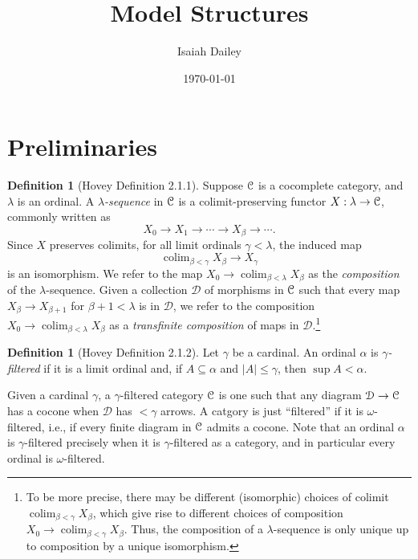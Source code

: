\documentclass{amsart}
\title{Model Structures}
\author{Isaiah Dailey}
\date{\today}
\theoremstyle{plain}
\theoremstyle{definition}
\newtheorem{definition}[theorem]{Definition}
\newcommand{\sseq}{\subseteq}
\newcommand{\0}{\mathbf{0}}
\newcommand{\cC}{\mathcal C}
\newcommand{\cD}{\mathcal D}
\renewcommand{\(}{\left(}
\renewcommand{\)}{\right)}
\def\scr{\EuScript}
\def\cC{\scr{C}}
\DeclareMathOperator*{\colim}{colim}
\begin{document}
\maketitle


\tableofcontents

\section{Preliminaries}

\begin{definition}[Hovey Definition 2.1.1]
  Suppose $\cC$ is a cocomplete category, and $\lambda$ is an ordinal. A \textit{$\lambda$-sequence} in $\cC$ is a colimit-preserving functor $X:\lambda\to\cC$, commonly written as
  \[X_0\to X_1\to\cdots\to X_\beta\to\cdots.\]
  Since $X$ preserves colimits, for all limit ordinals $\gamma<\lambda$, the induced map
  \[\colim_{\beta<\gamma}X_\beta\to X_\gamma\]
  is an isomorphism. We refer to the map $X_0\to \colim_{\beta<\lambda}X_\beta$ as the \textit{composition} of the $\lambda$-sequence. Given a collection $\cD$ of morphisms in $\cC$ such that every map $X_\beta\to X_{\beta+1}$ for $\beta+1<\lambda$ is in $\cD$, we refer to the composition $X_0\to\colim_{\beta<\lambda}X_\beta$ as a \textit{transfinite composition} of maps in $\cD$.\footnote{To be more precise, there may be different (isomorphic) choices of colimit $\colim_{\beta<\gamma}X_\beta$, which give rise to different choices of composition $X_0\to\colim_{\beta<\gamma}X_\beta$. Thus, the composition of a $\lambda$-sequence is only unique up to composition by a unique isomorphism.}
\end{definition}

\begin{definition}[Hovey Definition 2.1.2]
  Let $\gamma$ be a cardinal. An ordinal $\alpha$ is \textit{$\gamma$-filtered} if it is a limit ordinal and, if $A\sseq\alpha$ and $|A|\leq\gamma$, then $\sup A<\alpha$.
\end{definition}

Given a cardinal $\gamma$, a $\gamma$-filtered category $\cC$ is one such that any diagram $\cD\to\cC$ has a cocone when $\cD$ has $<\gamma$ arrows. A catgory is just ``filtered'' if it is $\omega$-filtered, i.e., if every finite diagram in $\cC$ admits a cocone. Note that an ordinal $\alpha$ is $\gamma$-filtered precisely when it is $\gamma$-filtered as a category, and in particular every ordinal is $\omega$-filtered.
\end{document}
